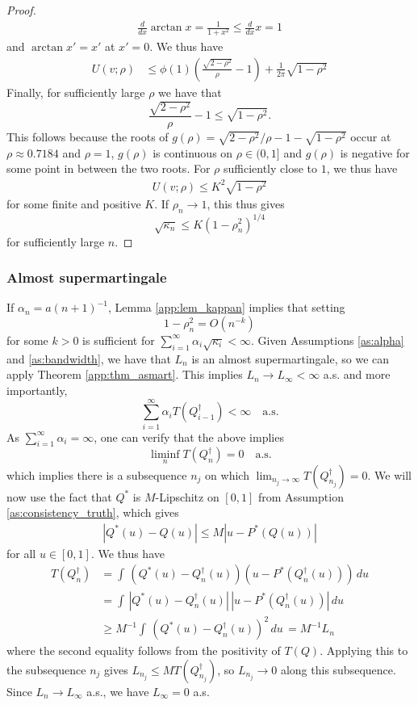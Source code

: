 \documentclass[11pt,a4paper]{article}
\begin{document}
\begin{appendices}
\begin{proof}
\begin{align*}
    \frac{d }{dx}\arctan x = \frac{1}{1+x^2} \leq \frac{d }{dx}x=1
\end{align*}
and $\arctan x' = x'$ at $x' = 0$. We thus have
\begin{align*}
U(v;\rho)  &\leq \phi(1)\left(\frac{\sqrt{2-\rho^2}}{\rho} - 1\right) + \frac{1}{2\pi}\sqrt{1-\rho^2}
\end{align*}
Finally, for sufficiently large $\rho$ we have that 
$$
\frac{\sqrt{2-\rho^2}}{\rho} - 1 \leq \sqrt{1-\rho^2}.
$$
This follows because the roots of $g(\rho) = 
{\sqrt{2-\rho^2}}/{\rho} - 1 - \sqrt{1-\rho^2}$ occur at $\rho \approx 0.7184$ and $\rho = 1$, $g(\rho)$ is continuous on $\rho \in (0,1]$ and $g(\rho)$ is negative for some point in between the two roots. For $\rho$ sufficiently close to $1$, we thus have
\begin{equation}
    \begin{aligned}
        U(v; \rho) \leq K^2\sqrt{1-\rho^2}
    \end{aligned}
\end{equation}
for some finite and positive $K$. If $\rho_n \to 1$, this thus gives
$$
\sqrt{\kappa_n} \leq K (1-\rho_n^2)^{1/4}
$$
for sufficiently large $n$. 
\end{proof}


\subsubsection{Almost supermartingale}
If $\alpha_n = a(n+1)^{-1}$, {Lemma \ref{app:lem_kappan}} implies that setting
$$
1-\rho_n^2 = O(n^{-k})
$$
for some $k > 0$ is sufficient for $\sum_{i=1}^\infty \alpha_i \sqrt{\kappa_i} < \infty$.
Given {Assumptions \ref{as:alpha}} and {\ref{as:bandwidth}}, we have that $L_{n}$ is an almost supermartingale, so we can apply {Theorem \ref{app:thm_asmart}}. This implies $L_n \to L_\infty <\infty$ a.s. and more importantly,
$$
\sum_{i=1}^\infty \alpha_i T(Q_{i-1}^{\dagger}) < \infty \quad \text{a.s.}
$$
As $\sum_{i = 1}^\infty \alpha_i = \infty$, one can verify that the above implies
$$
\liminf_{n} T(Q_n^{\dagger}) = 0 \quad \text{a.s.}
$$
which implies there is a subsequence $n_j$ on which $\lim_{n_j \to \infty}T(Q_{n_j}^{\dagger}) = 0$.
We will now use the fact that $Q^*$ is $M$-Lipschitz on $[0,1]$ from {Assumption \ref{as:consistency_truth}}, which gives
\begin{align*}
  |Q^*(u) - Q(u)| \leq M|u - P^*(Q(u))|
\end{align*}
for all $ u \in [0,1]$. We thus have
\begin{align*}
       T(Q_{n}^{\dagger})&= \int \, (Q^*(u) - Q^\dagger_{n}(u))(u- P^*( Q^\dagger_{n}(u)))\, du
       \\&= \int \, |Q^*(u) - Q^\dagger_{n}(u)|\, |u- P^*( Q^\dagger_{n}(u))|\,du \\
&\geq M^{-1}\int \, (Q^*(u) - Q^\dagger_{n}(u))^2\, du\, = M^{-1} L_n
\end{align*}
where the second equality follows from the positivity of $T(Q)$. Applying this to the subsequence $n_j$ gives $ L_{n_j}\leq M T(Q_{n_j}^{\dagger})$, so $L_{n_j}\to 0$ along this subsequence. Since $L_n \to L_\infty$ a.s., we have $L_\infty = 0$ a.s.


\end{appendices}
\end{document}
